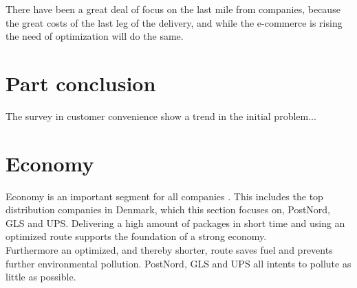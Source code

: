 \documentclass[12pt]{report}
\begin{document}
There have been a great deal of focus on the last mile from companies, because the great costs of the last leg of the delivery, and while the e-commerce is rising the need of optimization will do the same. \\\hspace*{5 mm}




\section{Part conclusion}
The survey in customer convenience show a trend in the initial problem...



\section{Economy}
Economy is an important segment for all companies \cite{economyimportance}. This includes the top distribution companies in Denmark, which this section focuses on, PostNord, GLS and UPS\cite{okonomiskansvar, Postnordmiljoansvar, ThinkGLS}. Delivering a high amount of packages in short time and using an optimized route supports the foundation of a strong economy.\\\hspace*{5mm}
Furthermore an optimized, and thereby shorter, route saves fuel and prevents further environmental pollution. PostNord, GLS and UPS all intents to pollute as little as possible\cite{Postnordmiljoansvar, ThinkGLS, UPSmiljo}.
\end{document}
